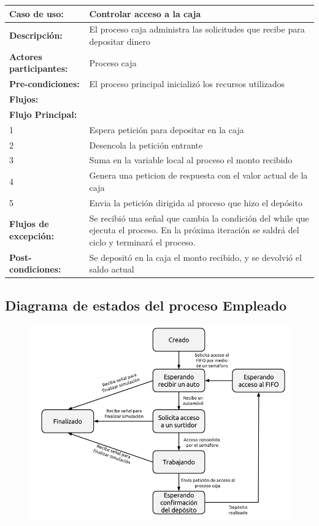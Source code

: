 \documentclass[12pt,a4paper,spanish]{article}
\begin{document}
	\begin{tabular}{|p{4cm}|p{12cm}|}
    \hline
    \textbf{Caso de uso:} & Controlar acceso a la caja \\
    \hline
    \textbf{Descripción:} &  El proceso caja administra las solicitudes que recibe para depositar dinero\\
    \hline
    \textbf{Actores participantes:} & Proceso caja\\
    \hline
 
    \textbf{Pre-condiciones:} &  El proceso principal inicializó los recursos utilizados\\
    \hline
    \hline
    \textbf{Flujos:} &\\
    \hline
	\textbf{Flujo Principal:} &\\ 

	\hline
	1 & Espera petición para depositar en la caja\\
	\hline
	2 & Desencola la petición entrante\\
	\hline
	3 & Suma en la variable local al proceso el monto recibido\\
	\hline
	4 & Genera una peticion de respuesta con el valor actual de la caja\\
	\hline
	5 & Envia la petición dirigida al proceso que hizo el depósito\\
	\hline
	\hline
	\textbf{Flujos de excepción:} & Se recibió una señal que cambia la condición del while que ejecuta el proceso. En la próxima iteración se saldrá del ciclo y terminará el proceso.\\
    \hline

    \hline
	\textbf{Post-condiciones:} & Se depositó en la caja el monto recibido, y se devolvió el saldo actual\\
	\hline
	\end{tabular}

	\newpage
	\subsection{Diagrama de estados del proceso Empleado}

	\begin{figure}[h]
	\includegraphics[scale=0.60]{FSM_Empleado.png}
	\centering
	\end{figure}
\end{document}
